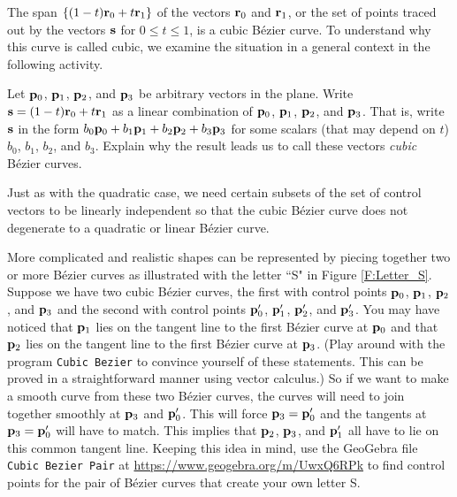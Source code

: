 The span $\{(1-t)\mathbf{r}_0 + t \mathbf{r}_1\}$ of the vectors $\mathbf{r}_0$ and $\mathbf{r}_1$, or the set of points traced out by the vectors $\mathbf{s}$ for $0 \leq t \leq 1$, is a cubic B\'{e}zier curve. To understand why this curve is called cubic, we examine the situation in a general context in the following activity.

\begin{pactivity} \label{act:1_d_cubic_Bezier_general} Let $\mathbf{p}_0$, $\mathbf{p}_1$, $\mathbf{p}_2$, and $\mathbf{p}_3$ be arbitrary vectors in the plane. Write $\mathbf{s} =  (1-t)\mathbf{r}_0 + t\mathbf{r}_1$ as a linear combination of $\mathbf{p}_0$, $\mathbf{p}_1$, $\mathbf{p}_2$, and $\mathbf{p}_3$. That is, write $\mathbf{s}$ in the form $b_0 \mathbf{p}_0 + b_1 \mathbf{p}_1 + b_2 \mathbf{p}_2 + b_3 \mathbf{p}_3$ for some scalars (that may depend on $t$) $b_0$, $b_1$, $b_2$, and $b_3$. Explain why the result leads us to call these vectors \emph{cubic} B\'{e}zier curves. 
\end{pactivity}

Just as with the quadratic case, we need certain subsets of the set of control vectors to be linearly independent so that the cubic B\'{e}zier curve does not degenerate to a quadratic or linear B\'{e}zier curve.  

More complicated and realistic shapes can be represented by piecing together two or more B\'{e}zier curves  as illustrated with the letter ``S" in Figure \ref{F:Letter_S}. Suppose we have two cubic B\'{e}zier curves, the first with control points  $\mathbf{p}_0$, $\mathbf{p}_1$, $\mathbf{p}_2$, and $\mathbf{p}_3$ and the second with control points  $\mathbf{p}_0'$, $\mathbf{p}_1'$, $\mathbf{p}_2'$, and $\mathbf{p}_3'$.  You may have noticed that $\mathbf{p}_1$ lies on the tangent line to the first B\'{e}zier curve at $\mathbf{p}_0$ and that $\mathbf{p}_2$ lies on the tangent line to the first B\'{e}zier curve at $\mathbf{p}_3$. (Play around with the program \texttt{Cubic Bezier} to convince yourself of these statements. This can be proved in a straightforward manner using vector calculus.) So if we want to make a smooth curve from these two B\'{e}zier curves, the curves will need to join together smoothly at $\mathbf{p}_3$ and $\mathbf{p}_0'$. This will force $\mathbf{p}_3 = \mathbf{p}_0'$ and the tangents at $\mathbf{p}_3 = \mathbf{p}_0'$ will have to match. This implies that $\mathbf{p}_2$, $\mathbf{p}_3$, and $\mathbf{p}_1'$ all have to lie on this common tangent line. Keeping this idea in mind, use the GeoGebra file \texttt{Cubic Bezier Pair} at \url{https://www.geogebra.org/m/UwxQ6RPk} to find control points for the pair of B\'{e}zier curves that create your own letter S. 


